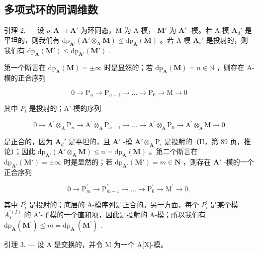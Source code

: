 \subsection{多项式环的同调维数}

引理 2. --- 设 \(\rho: \mathbf{A} \to \mathbf{A}'\) 为环同态，M 为 A-模， \(\mathbf{M}'\) 为 \(\mathbf{A}'\) -模。若 A-模 \(\mathbf{A}_d'\) 是平坦的，则我们有 \(\mathrm{dp}_{\mathbf{A}'}(\mathbf{A}' \otimes_{\mathbf{A}} \mathbf{M}) \leqslant \mathrm{dp}_{\mathbf{A}}(\mathbf{M})\) 。若 A-模 \(\mathbf{A}_s'\) 是投射的，则我们有 \(\mathrm{dp}_{\mathbf{A}}(\mathbf{M}') \leqslant \mathrm{dp}_{\mathbf{A}'}(\mathbf{M}')\) .

第一个断言在 \(\mathrm{dp}_{\mathbf{A}}(\mathbf{M}) = \pm \infty\) 时是显然的；若 \(\mathrm{dp}_{\mathbf{A}}(\mathbf{M}) = n \in \mathbb{N}\) ，则存在 A-模的正合序列

\[
0 \rightarrow \mathrm{P} _ {n} \rightarrow \mathrm{P} _ {n - 1} \rightarrow \dots \rightarrow \mathrm{P} _ {0} \rightarrow \mathrm{M} \rightarrow 0
\]

其中 \(P_{i}\) 是投射的；A'-模的序列

\[
0 \rightarrow \mathrm{A} ^ {\prime} \otimes_ {\mathrm{A}} \mathrm{P} _ {n} \rightarrow \mathrm{A} ^ {\prime} \otimes_ {\mathrm{A}} \mathrm{P} _ {n - 1} \rightarrow \dots \rightarrow \mathrm{A} ^ {\prime} \otimes_ {\mathrm{A}} \mathrm{P} _ {0} \rightarrow \mathrm{A} ^ {\prime} \otimes_ {\mathrm{A}} \mathrm{M} \rightarrow 0
\]

是正合的，因为 \(\mathbf{A}_d'\) 是平坦的，且 \(\mathbf{A}'\) -模 \(\mathbf{A}' \otimes_{\mathbf{A}} \mathrm{P}_i\) 是投射的（II，第 89 页，推论）；因此 \(\mathrm{dp}_{\mathbf{A}'}(\mathbf{A}' \otimes_{\mathbf{A}} \mathbf{M}) \leqslant n = \mathrm{dp}_{\mathbf{A}}(\mathbf{M})\) 。第二个断言在 \(\mathrm{dp}_{\mathbf{A}'}(\mathbf{M}') = \pm \infty\) 时是显然的；若 \(\mathrm{dp}_{\mathbf{A}'}(\mathbf{M}') = m \in \mathbf{N}\) ，则存在 \(\mathbf{A}'\) -模的一个正合序列

\[
0 \to \mathrm{P} _ {m} ^ {\prime} \to \mathrm{P} _ {m - 1} ^ {\prime} \to \dots \to \mathrm{P} _ {0} ^ {\prime} \to \mathrm{M} ^ {\prime} \to 0,
\]

其中 \(P_{i}^{\prime}\) 是投射的；底层的 A-模序列是正合的。另一方面，每个 \(P_{i}^{\prime}\) 是某个模 \(A_{s}^{\prime(I)}\) 的 A'-子模的一个直和项，因此是投射的 A-模；所以我们有 \(\mathrm{dp}_{\mathbf{A}}(\mathbf{M}^{\prime}) \leqslant m = \mathrm{dp}_{\mathbf{A}^{\prime}}(\mathbf{M}^{\prime})\) .

引理 3. --- 设 A 是交换的，并令 M 为一个 A{[}X{]}-模。

